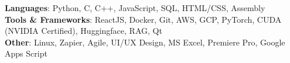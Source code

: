 \begin{itemize}[leftmargin=0.15in, label={}]
  \small{
    \item{
      \textbf{Languages}{: Python, C, C++, JavaScript, SQL, HTML/CSS, Assembly} \\
      \textbf{Tools \& Frameworks}{: ReactJS, Docker, Git, AWS, GCP, PyTorch, CUDA (NVIDIA Certified), Huggingface, RAG, Qt} \\
      \textbf{Other}{: Linux, Zapier, Agile, UI/UX Design, MS Excel, Premiere Pro, Google Apps Script }
      }
  }
\end{itemize}